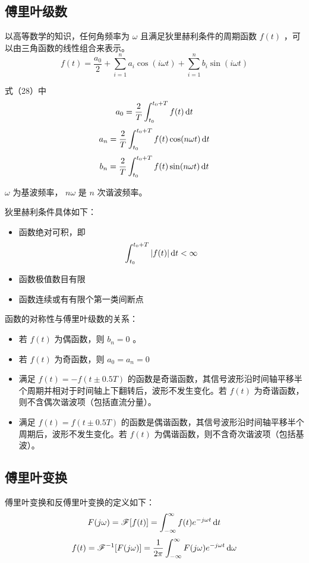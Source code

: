 \documentclass[UTF8,a4paper,11pt]{article}
\begin{document}
\subsection{傅里叶级数}
以高等数学的知识，任何角频率为 $\omega$ 且满足狄里赫利条件的周期函数 $f(t)$ ，可以由三角函数的线性组合来表示。
\begin{equation}
f(t)=\frac{a_0}{2}+\sum_{i=1}^n a_i\cos(i\omega t)+\sum_{i=1}^n b_i\sin(i\omega t)
\end{equation}

式（28）中
\begin{equation}
a_0=\frac{2}{T}\int_{t_0}^{t_0+T} {f(t)} \,{\rm d}t
\end{equation}
\begin{equation}
a_n=\frac{2}{T}\int_{t_0}^{t_0+T} {f(t)\cos(n\omega t)} \,{\rm d}t
\end{equation}
\begin{equation}
b_n=\frac{2}{T}\int_{t_0}^{t_0+T} {f(t)\sin(n\omega t)} \,{\rm d}t
\end{equation}

$\omega$ 为基波频率， $n\omega$ 是 $n$ 次谐波频率。

狄里赫利条件具体如下：
\begin{itemize}
\item 函数绝对可积，即
\begin{equation}
\int_{t_0}^{t_0+T} {\left | f(t) \right |} \,{\rm d}t<\infty
\end{equation}
\item 函数极值数目有限
\item 函数连续或有有限个第一类间断点
\end{itemize} 

函数的对称性与傅里叶级数的关系：
\begin{itemize}
\item 若 $f(t)$ 为偶函数，则 $b_n=0$ 。
\item 若 $f(t)$ 为奇函数，则 $a_0=a_n=0$
\item 满足 $f(t)=-f(t\pm 0.5T)$ 的函数是奇谐函数，其信号波形沿时间轴平移半个周期并相对于时间轴上下翻转后，波形不发生变化。若 $f(t)$ 为奇谐函数，则不含偶次谐波项（包括直流分量）。
\item 满足 $f(t)=f(t\pm 0.5T)$ 的函数是偶谐函数，其信号波形沿时间轴平移半个周期后，波形不发生变化。若 $f(t)$ 为偶谐函数，则不含奇次谐波项（包括基波）。
\end{itemize} 

\subsection{傅里叶变换}
傅里叶变换和反傅里叶变换的定义如下：
\begin{equation}
F(j\omega)=\mathscr{F}[f(t)]=\int_{-\infty}^{\infty} {f(t)e^{-j\omega t}} \,{\rm d}t
\end{equation}
\begin{equation}
f(t)=\mathscr{F}^{-1}[F(j\omega)]=\frac{1}{2\pi}\int_{-\infty}^{\infty} {F(j\omega)e^{-j\omega t}} \,{\rm d}\omega
\end{equation}
\end{document}
